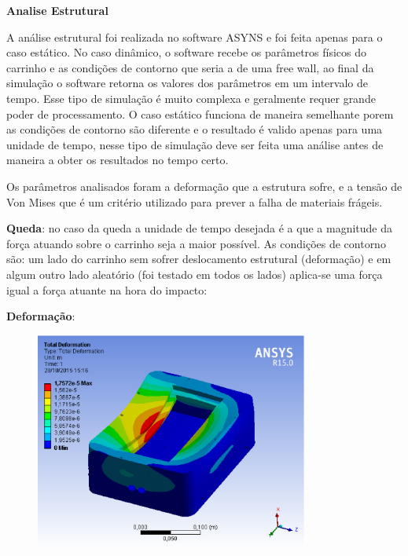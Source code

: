 \textbf{Analise Estrutural}

A análise estrutural foi realizada no software ASYNS e foi feita apenas para o caso estático. No caso dinâmico, o software recebe os parâmetros físicos do carrinho e as condições de contorno que seria a de uma free wall, ao final da simulação o software retorna os valores dos parâmetros em um intervalo de tempo. Esse tipo de simulação é muito complexa e geralmente requer grande poder de processamento. O caso estático funciona de maneira semelhante porem as condições de contorno são diferente e o resultado é valido apenas para uma unidade de tempo, nesse tipo de simulação deve ser feita uma análise antes de maneira a obter os resultados no tempo certo.

Os parâmetros analisados foram a deformação que a estrutura sofre, e a tensão de Von Mises que é um critério utilizado para prever a falha de materiais frágeis.

\textbf{Queda}: no caso da queda a unidade de tempo desejada é a que a magnitude da força atuando sobre o carrinho seja a maior possível. As condições de contorno são: um lado do carrinho sem sofrer deslocamento estrutural (deformação) e em algum outro lado aleatório (foi testado em todos os lados) aplica-se uma força igual a força atuante na hora do impacto:

\textbf{Deformação}:

\begin{figure}[H]
    \centering
    \includegraphics[width=0.8\textwidth]{figuras/deformacao_1000n.eps}
    \caption{}
    \label{fig:catia01}
\end{figure}

